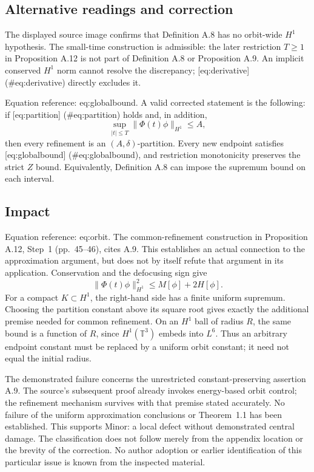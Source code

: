 \documentclass[10pt]{article}
\begin{document}
\subsection*{Alternative readings and correction}
The displayed source image confirms that Definition A.8 has no orbit-wide \(H^1\) hypothesis. The small-time construction is admissible: the later restriction \(T\geq1\) in Proposition A.12 is not part of Definition A.8 or Proposition A.9. An implicit conserved \(H^1\) norm cannot resolve the discrepancy; [eq:derivative] (\#eq:derivative) directly excludes it.\par
Equation reference: eq:globalbound. A valid corrected statement is the following: if [eq:partition] (\#eq:partition) holds and, in addition, \[
 \sup_{|t|\leq T}\|\Phi(t)\phi\|_{H^1}\leq A,\] then every refinement is an \((A,\delta)\)-partition. Every new endpoint satisfies [eq:globalbound] (\#eq:globalbound), and restriction monotonicity preserves the strict \(Z\) bound. Equivalently, Definition A.8 can impose the supremum bound on each interval.\par
\subsection*{Impact}
Equation reference: eq:orbit. The common-refinement construction in Proposition A.12, Step 1 (pp. 45–46), cites A.9. This establishes an actual connection to the approximation argument, but does not by itself refute that argument in its application. Conservation and the defocusing sign give \[
 \|\Phi(t)\phi\|_{H^1}^2\leq M[\phi]+2H[\phi].\] For a compact \(K\subset H^1\), the right-hand side has a finite uniform supremum. Choosing the partition constant above its square root gives exactly the additional premise needed for common refinement. On an \(H^1\) ball of radius \(R\), the same bound is a function of \(R\), since \(H^1(\mathbb T^3)\) embeds into \(L^6\). Thus an arbitrary endpoint constant must be replaced by a uniform orbit constant; it need not equal the initial radius.\par
The demonstrated failure concerns the unrestricted constant-preserving assertion A.9. The source’s subsequent proof already invokes energy-based orbit control; the refinement mechanism survives with that premise stated accurately. No failure of the uniform approximation conclusions or Theorem 1.1 has been established. This supports Minor: a local defect without demonstrated central damage. The classification does not follow merely from the appendix location or the brevity of the correction. No author adoption or earlier identification of this particular issue is known from the inspected material.\par
\end{document}
